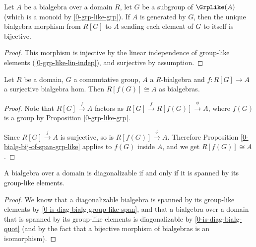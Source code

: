 \begin{proposition}
  \label{0-bialg-bij-of-span-grp-like}

  Let $A$ be a bialgebra over a domain $R$,
  let $G$ be a subgroup of $\GrpLike(A)$ (which is a monoid by \ref{0-grp-like-grp}).
  If $A$ is generated by $G$,
  then the unique bialgebra morphism from $R[G]$ to $A$
  sending each element of $G$ to itself is bijective.
\end{proposition}
\begin{proof}
  \leanok

  This morphism is injective by the linear independence of group-like elements
  (\ref{0-grp-like-lin-indep}), and surjective by assumption.
\end{proof}


\begin{proposition}
  \label{0-is-diag-bialg-quot}

  Let $R$ be a domain, $G$ a commutative group,
  $A$ a $R$-bialgebra and $f : R[G] \to A$ a surjective bialgebra hom.
  Then $R[f(G)] \cong A$ as bialgebras.
\end{proposition}
\begin{proof}

  Note that $R[G] \xrightarrow f A$ factors as $R[G] \xrightarrow f R[f(G)] \xrightarrow\phi A$,
  where $f(G)$ is a group by Proposition \ref{0-grp-like-grp}.

  Since $R[G] \xrightarrow f A$ is surjective, so is $R[f(G)] \xrightarrow\phi A$.
  Therefore Proposition \ref{0-bialg-bij-of-span-grp-like} applies to $f(G)$ inside $A$,
  and we get $R[f(G)] \cong A$.
\end{proof}


\begin{corollary}
  \label{0-is-diag-bialg-iff-span-group-like}
  \leanok

  A bialgebra over a domain is diagonalizable if and only if it is spanned by its
  group-like elements.
\end{corollary}
\begin{proof}
  \leanok

  We know that a diagonalizable bialgebra is spanned by its group-like elements
  by \ref{0-is-diag-bialg-group-like-span}, and that a bialgebra over a domain
  that is spanned by its group-like elements is diagonalizable by
  \ref{0-is-diag-bialg-quot} (and by the fact that a bijective morphism
  of bialgebras is an isomorphism).
\end{proof}

